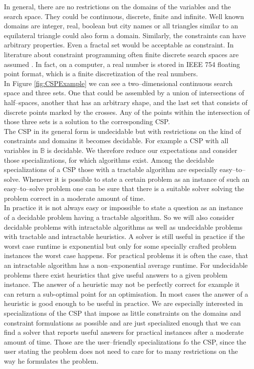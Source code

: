 In general, there are no restrictions on the domains of the variables and the search space. They could be continuous, discrete, finite and infinite. Well known domains are integer, real, boolean but city names or all triangles similar to an equilateral triangle could also form a domain. Similarly, the constraints can have arbitrary properties. Even a fractal set would be acceptable as constraint. In literature about constraint programming often finite discrete search spaces are assumed \cite{Citation Needed}. In fact, on a computer, a real number is stored in IEEE 754 floating point format, which is a finite discretization of the real numbers. \\
In Figure \ref{fig:CSPExample} we can see a two--dimensional continuous search space and three sets. One that could be assembled by a union of intersections of half--spaces, another that has an arbitrary shape, and the last set that consists of discrete points marked by the crosses. Any of the points within the intersection of those three sets is a solution to the corresponding CSP.\\
The CSP in its general form is undecidable but with restrictions on the kind of constraints and domains it becomes decidable. For example a CSP with all variables in $\mathbb{B}$ is decidable. We therefore reduce our expectations and consider those specializations, for which algorithms exist. Among the decidable specializations of a CSP those with a tractable algorithm are especially easy--to--solve. Whenever it is possible to state a certain problem as an instance of such an easy--to--solve problem one can be sure that there is a suitable solver solving the problem correct in a moderate amount of time.\\
In practice it is not always easy or impossible to state a question as an instance of a decidable problem having a tractable algorithm. So we will also consider decidable problems with intractable algorithms as well as undecidable problems with tractable and intractable heuristics. A solver is still useful in practice if the worst case runtime is exponential but only for some specially crafted problem instances the worst case happens.%
For practical problems it is often the case, that an intractable algorithm has a non--exponential average runtime. 
For undecidable problems there exist heuristics that give useful answers to a given problem instance. The answer of a heuristic may not be perfectly correct for example it can return a sub-optimal point for an optimisation. In most cases the answer of a heuristic is good enough to be useful in practice. We are especially interested in specializations of the CSP that impose as little constraints on the domains and constraint formulations as possible and are just specialized enough that we can find a solver that reports useful answers for practical instances after a moderate amount of time. Those are the user--friendly specializations fo the CSP, since the user stating the problem does not need to care for to many restrictions on the way he formulates the problem.
